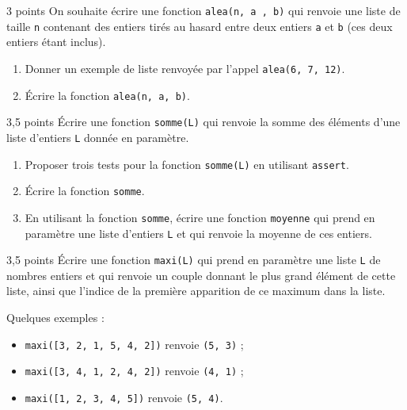 \documentclass[a4paper,dvipsnames]{article}
\begin{document}
\medskip

\begin{exercice}{3 points}{}
  On souhaite écrire une fonction \texttt{alea(n, a , b)} qui renvoie une liste de taille \texttt{n} contenant des entiers tirés au hasard entre deux entiers \texttt{a} et \texttt{b} (ces deux entiers étant inclus).
  \begin{enumerate}
    \item Donner un exemple de liste renvoyée par l'appel \texttt{alea(6, 7, 12)}.
    \item Écrire la fonction \texttt{alea(n, a, b)}.
  \end{enumerate}
\end{exercice}

\medskip

\begin{exercice}{3,5 points}{}
  Écrire une fonction \texttt{somme(L)} qui renvoie la somme des éléments d'une liste d'entiers \texttt{L} donnée en paramètre.
  \begin{enumerate}
    \item Proposer trois tests pour la fonction \texttt{somme(L)} en utilisant \texttt{assert}.
    \item Écrire la fonction \texttt{somme}.
    \item En utilisant la fonction \texttt{somme}, écrire une fonction \texttt{moyenne} qui prend en paramètre une liste d'entiers \texttt{L} et qui renvoie la moyenne de ces entiers.
  \end{enumerate}
\end{exercice}

\medskip

\begin{exercice}{3,5 points}{}
  Écrire une fonction \texttt{maxi(L)} qui prend en paramètre une liste \texttt{L} de nombres entiers et qui renvoie un couple donnant le plus grand élément de cette liste, ainsi que l'indice de la première apparition de ce maximum dans la liste.

  \tcblower

  Quelques exemples :
  \begin{itemize}
    \item \texttt{maxi([3, 2, 1, 5, 4, 2])} renvoie \texttt{(5, 3)} ;
    \item \texttt{maxi([3, 4, 1, 2, 4, 2])} renvoie \texttt{(4, 1)} ;
    \item \texttt{maxi([1, 2, 3, 4, 5])} renvoie \texttt{(5, 4)}.
  \end{itemize}
\end{exercice}
\end{document}
